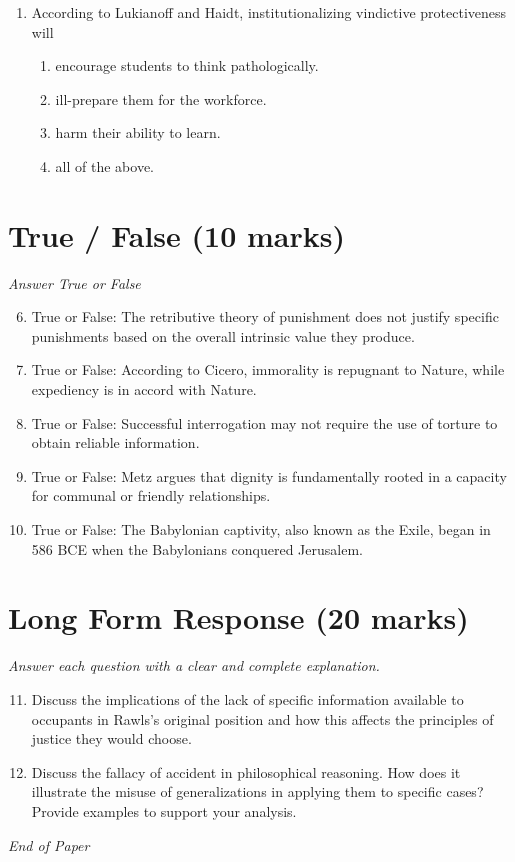 \documentclass[12pt]{article}
\begin{document}
\begin{enumerate}[label=\arabic*.]
\begin{enumerate}[label=(\alph*)]
    \item egoistic hedonism
    \item moral relativism
\end{enumerate}
\item According to Lukianoff and Haidt, institutionalizing vindictive protectiveness will
\begin{enumerate}[label=(\alph*)]
    \item encourage students to think pathologically.
    \item ill-prepare them for the workforce.
    \item harm their ability to learn.
    \item all of the above.
\end{enumerate}
\end{enumerate}

\section*{True / False (10 marks)}
\textit{Answer True or False}
\begin{enumerate}[label=\arabic*.]
\setcounter{enumi}{5}
\item True or False: The retributive theory of punishment does not justify specific punishments based on the overall intrinsic value they produce.
\item True or False: According to Cicero, immorality is repugnant to Nature, while expediency is in accord with Nature.
\item True or False: Successful interrogation may not require the use of torture to obtain reliable information.
\item True or False: Metz argues that dignity is fundamentally rooted in a capacity for communal or friendly relationships.
\item True or False: The Babylonian captivity, also known as the Exile, began in 586 BCE when the Babylonians conquered Jerusalem.
\end{enumerate}

\section*{Long Form Response (20 marks)}
\textit{Answer each question with a clear and complete explanation.}
\begin{enumerate}[label=\arabic*.]
\setcounter{enumi}{10}
\item Discuss the implications of the lack of specific information available to occupants in Rawls's original position and how this affects the principles of justice they would choose.
\item Discuss the fallacy of accident in philosophical reasoning. How does it illustrate the misuse of generalizations in applying them to specific cases? Provide examples to support your analysis.
\end{enumerate}

\vfill
\noindent\textit{End of Paper}
\end{document}

